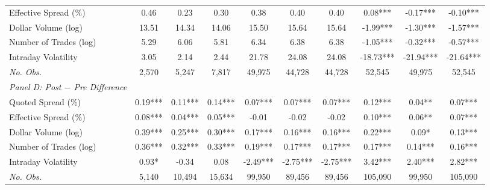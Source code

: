 \begin{table}[!htp]
\begin{adjustbox}{max width=\textwidth}
\begin{tabular}{lccccccccc}
Effective Spread (\%) & 0.46 & 0.23 & 0.30 & 0.38 & 0.40 & 0.40 & 0.08*** & -0.17*** & -0.10*** \\
Dollar Volume (log) & 13.51 & 14.34 & 14.06 & 15.50 & 15.64 & 15.64 & -1.99*** & -1.30*** & -1.57*** \\
Number of Trades (log) & 5.29 & 6.06 & 5.81 & 6.34 & 6.38 & 6.38 & -1.05*** & -0.32*** & -0.57*** \\
Intraday Volatility & 3.05 & 2.14 & 2.44 & 21.78 & 24.08 & 24.08 & -18.73*** & -21.94*** & -21.64*** \\
\textit{No. Obs.} &  2,570  &  5,247  &  7,817  &  49,975  &  44,728  &  44,728  &  52,545  &  49,975  &  52,545  \\
\cmidrule{1-10}
\textit{Panel D: Post $-$ Pre Difference} \\
\cmidrule{1-10}
Quoted Spread (\%) & 0.19*** & 0.11*** & 0.14*** & 0.07*** & 0.07*** & 0.07*** & 0.12*** & 0.04** & 0.07*** \\
Effective Spread (\%) & 0.08*** & 0.04*** & 0.05*** & -0.01 & -0.02 & -0.02 & 0.10*** & 0.06** & 0.07*** \\
Dollar Volume (log) & 0.39*** & 0.25*** & 0.30*** & 0.17*** & 0.16*** & 0.16*** & 0.22*** & 0.09* & 0.13*** \\
Number of Trades (log) & 0.36*** & 0.32*** & 0.33*** & 0.19*** & 0.17*** & 0.17*** & 0.17*** & 0.14*** & 0.16*** \\
Intraday Volatility & 0.93* & -0.34 & 0.08 & -2.49*** & -2.75*** & -2.75*** & 3.42*** & 2.40*** & 2.82*** \\
\textit{No. Obs.} &  5,140  &  10,494  &  15,634  &  99,950  &  89,456  &  89,456  &  105,090  &  99,950  &  105,090  \\
\cmidrule{1-10}
\end{tabular}
 \end{adjustbox}
 \end{table}
